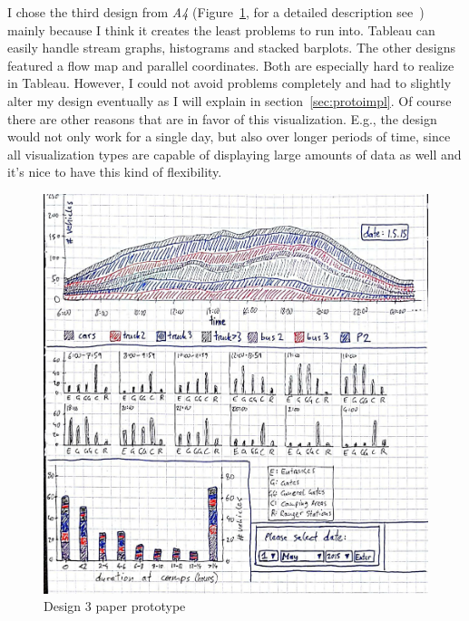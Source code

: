\documentclass{article}
\begin{document}
I chose the third design from \textit{A4} (Figure~\ref{fig:prototype}, for a detailed description see~) mainly because I think it creates the least problems to run into. Tableau can easily handle stream graphs, histograms and stacked barplots. The other designs featured a flow map and parallel coordinates. Both are especially hard to realize in Tableau. However, I could not avoid problems completely and had to slightly alter my design eventually as I will explain in section~\ref{sec:protoimpl}. Of course there are other reasons  that are in favor of this visualization. E.g., the design would not only work for a single day, but also over longer periods of time, since all visualization types are capable of displaying large amounts of data as well and it's nice to have this kind of flexibility.

\begin{figure}[h]
	\centering
	\includegraphics[scale = .45]{Design3.jpg}
	\caption{Design 3 paper prototype}
	\label{fig:prototype}
\end{figure}
\end{document}
